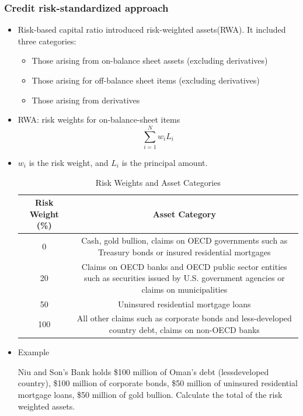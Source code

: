 \subsubsection{Credit risk-standardized approach}
\begin{itemize}
\item Risk-based capital ratio introduced risk-weighted assets(RWA). It included three categories:
    \begin{itemize}
    \item Those arising from on-balance sheet assets (excluding derivatives)
    \item Those arising for off-balance sheet items (excluding derivatives)
    \item Those arising from derivatives
    \end{itemize}
\item RWA: risk weights for on-balance-sheet items
    \begin{equation}
    \sum_{i=1}^{N} w_i L_i
    \end{equation}
\item $w_i$ is the risk weight, and $L_i$ is the principal amount.
\begin{table}[h]
    \centering
    \caption{Risk Weights and Asset Categories}
    \renewcommand{\arraystretch}{1.5} %
    \begin{tabular}{|c|c|}
        \hline
        \textbf{Risk Weight (\%)} & \textbf{Asset Category} \\
        \hline
        0 & Cash, gold bullion, claims on OECD governments such as Treasury bonds or insured residential mortgages \\
        \hline
        20 & Claims on OECD banks and OECD public sector entities such as securities issued by U.S. government agencies or claims on municipalities \\
        \hline
        50 & Uninsured residential mortgage loans \\
        \hline
        100 & All other claims such as corporate bonds and less-developed country debt, claims on non-OECD banks \\
        \hline
    \end{tabular}
\end{table}

\item Example

Niu and Son's Bank holds \$100 million of Oman's debt (lessdeveloped country), \$100 million of corporate bonds, \$50 million of uninsured residential mortgage loans, \$50 million of gold bullion. Calculate the total of the risk weighted assets.


\end{itemize}
